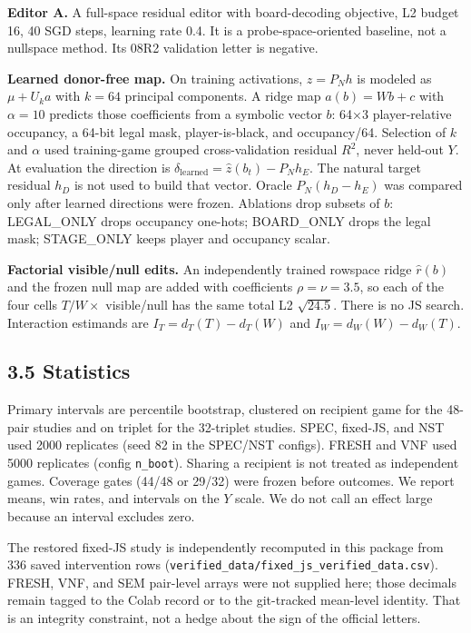 \documentclass[11pt]{article}
\begin{document}
\textbf{Editor A.} A full-space residual editor with board-decoding objective, L2 budget 16, 40 SGD steps, learning rate 0.4. It is a probe-space-oriented baseline, not a nullspace method. Its 08R2 validation letter is negative.

\textbf{Learned donor-free map.} On training activations, \(z=P_N h\) is modeled as \(\mu+U_k a\) with \(k=64\) principal components. A ridge map \(\widehat a(b)=Wb+c\) with \(\alpha=10\) predicts those coefficients from a symbolic vector \(b\): 64×3 player-relative occupancy, a 64-bit legal mask, player-is-black, and occupancy/64. Selection of \(k\) and \(\alpha\) used training-game grouped cross-validation residual \(R^2\), never held-out \(Y\). At evaluation the direction is \(\delta_{\mathrm{learned}}=\widehat z(b_t)-P_N h_E\). The natural target residual \(h_D\) is not used to build that vector. Oracle \(P_N(h_D-h_E)\) was compared only after learned directions were frozen. Ablations drop subsets of \(b\): LEGAL\_ONLY drops occupancy one-hots; BOARD\_ONLY drops the legal mask; STAGE\_ONLY keeps player and occupancy scalar.

\textbf{Factorial visible/null edits.} An independently trained rowspace ridge \(\widehat r(b)\) and the frozen null map are added with coefficients \(\rho=\nu=3.5\), so each of the four cells \(T/W\times\) visible/null has the same total L2 \(\sqrt{24.5}\). There is no JS search. Interaction estimands are \(I_T=d_T(T)-d_T(W)\) and \(I_W=d_W(W)-d_W(T)\).

\subsection{3.5 Statistics}

Primary intervals are percentile bootstrap, clustered on recipient game for the 48-pair studies and on triplet for the 32-triplet studies. SPEC, fixed-JS, and NST used 2000 replicates (seed 82 in the SPEC/NST configs). FRESH and VNF used 5000 replicates (config \texttt{n\_boot}). Sharing a recipient is not treated as independent games. Coverage gates (44/48 or 29/32) were frozen before outcomes. We report means, win rates, and intervals on the \(Y\) scale. We do not call an effect large because an interval excludes zero.

The restored fixed-JS study is independently recomputed in this package from 336 saved intervention rows (\texttt{verified\_data/fixed\_js\_verified\_data.csv}). FRESH, VNF, and SEM pair-level arrays were not supplied here; those decimals remain tagged to the Colab record or to the git-tracked mean-level identity. That is an integrity constraint, not a hedge about the sign of the official letters.
\end{document}
